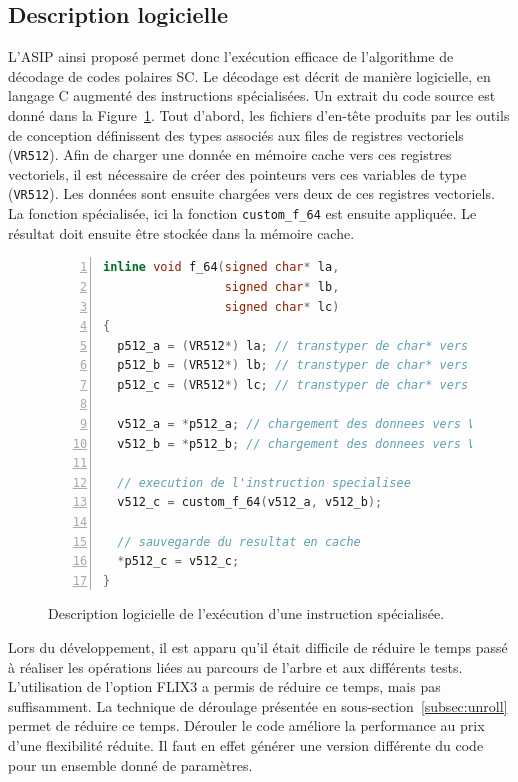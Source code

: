 \subsection{Description logicielle}
L'ASIP ainsi proposé permet donc l'exécution efficace de l'algorithme de décodage de codes polaires SC. Le décodage est décrit de manière logicielle, en langage C augmenté des instructions spécialisées. Un extrait du code source est donné dans la Figure~\ref{fig:f_code}. Tout d'abord, les fichiers d'en-tête produits par les outils de conception définissent des types associés aux files de registres vectoriels (\texttt{VR512}). Afin de charger une donnée en mémoire cache vers ces registres vectoriels, il est nécessaire de créer des pointeurs vers ces variables de type (\texttt{VR512}). Les données sont ensuite chargées vers deux de ces registres vectoriels. La fonction spécialisée, ici la fonction \texttt{custom\_f\_64} est ensuite appliquée. Le résultat doit ensuite être stockée dans la mémoire cache.
\begin{figure}[hb]
\begin{lstlisting}[language=C++, numbers=left, numbersep=0.3em, tabsize=2, basicstyle=\footnotesize\ttfamily]
inline void f_64(signed char* la, 
                 signed char* lb, 
                 signed char* lc)
{
  p512_a = (VR512*) la; // transtyper de char* vers VR512
  p512_b = (VR512*) lb; // transtyper de char* vers VR512
  p512_c = (VR512*) lc; // transtyper de char* vers VR512

  v512_a = *p512_a; // chargement des donnees vers VR512
  v512_b = *p512_b; // chargement des donnees vers VR512
  
  // execution de l'instruction specialisee
  v512_c = custom_f_64(v512_a, v512_b); 
  
  // sauvegarde du resultat en cache
  *p512_c = v512_c;     
}
\end{lstlisting}
\caption{Description logicielle de l'exécution d'une instruction spécialisée.}
\label{fig:f_code}
\end{figure}

Lors du développement, il est apparu qu'il était difficile de réduire le temps passé à réaliser les opérations liées au parcours de l'arbre et aux différents tests. L'utilisation de l'option FLIX3 a permis de réduire ce temps, mais pas suffisamment. La technique de déroulage présentée en sous-section~\ref{subsec:unroll} permet de réduire ce temps. Dérouler le code améliore la performance au prix d'une flexibilité réduite. Il faut en effet générer une version différente du code pour un ensemble donné de paramètres.


